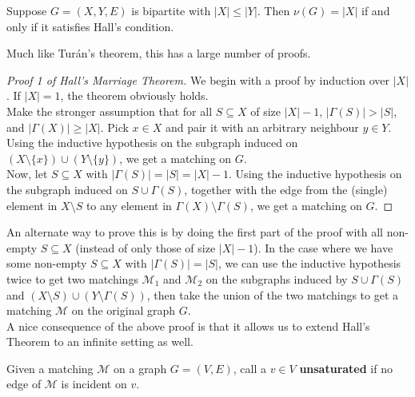 			\begin{ftheo}
				Suppose $G=(X,Y,E)$ is bipartite with $|X|\le |Y|$. Then $\nu(G) = |X|$ if and only if it satisfies Hall's condition.
			\end{ftheo}
			Much like Tur\'{a}n's theorem, this has a large number of proofs.
			\begin{proof}[Proof 1 of Hall's Marriage Theorem]
				We begin with a proof by induction over $|X|$. If $|X|=1$, the theorem obviously holds.\\
				Make the stronger assumption that for all $S\subseteq X$ of size $|X|-1$, $|\Gamma(S)| > |S|$, and $|\Gamma(X)| \ge |X|$. Pick $x\in X$ and pair it with an arbitrary neighbour $y\in Y$. Using the inductive hypothesis on the subgraph induced on $(X\setminus\{x\}) \cup (Y\setminus\{y\})$, we get a matching on $G$.\\
				Now, let $S\subseteq X$ with $|\Gamma(S)|=|S|=|X|-1$. Using the inductive hypothesis on the subgraph induced on $S\cup\Gamma(S)$, together with the edge from the (single) element in $X\setminus S$ to any element in $\Gamma(X)\setminus\Gamma(S)$, we get a matching on $G$.
			\end{proof}
			An alternate way to prove this is by doing the first part of the proof with all non-empty $S\subseteq X$ (instead of only those of size $|X|-1$). In the case where we have some non-empty $S\subseteq X$ with $|\Gamma(S)|=|S|$, we can use the inductive hypothesis twice to get two matchings $\mathcal{M}_1$ and $\mathcal{M}_2$ on the subgraphs induced by $S \cup \Gamma(S)$ and $(X\setminus S) \cup (Y\setminus\Gamma(S))$, then take the union of the two matchings to get a matching $\mathcal{M}$ on the original graph $G$.\\

			A nice consequence of the above proof is that it allows us to extend Hall's Theorem to an infinite setting as well.

			\begin{definition}
				Given a matching $\mathcal{M}$ on a graph $G=(V,E)$, call a $v\in V$ \textbf{unsaturated} if no edge of $\mathcal{M}$ is incident on $v$.
			\end{definition}

